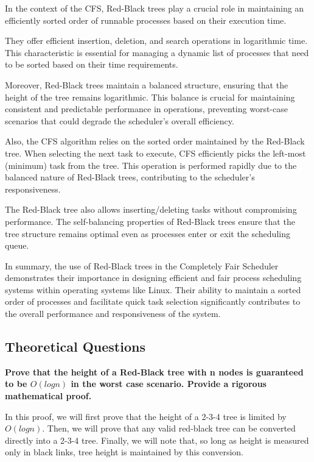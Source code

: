 \documentclass[12pt]{amsart}
\begin{document}
   In the context of the CFS, Red-Black trees play a crucial
   role in maintaining an efficiently sorted order of runnable
   processes based on their execution time.
   
   They offer efficient insertion, deletion, and search
   operations in logarithmic time. This characteristic is
   essential for managing a dynamic list of processes that need
   to be sorted based on their time requirements.
   
   Moreover, Red-Black trees maintain a balanced structure,
   ensuring that the height of the tree remains logarithmic.
   This balance is crucial for maintaining consistent and
   predictable performance in operations, preventing worst-case
   scenarios that could degrade the scheduler's overall
   efficiency.
   
   Also, the CFS algorithm relies on the sorted order maintained
   by the Red-Black tree. When selecting the next task to
   execute, CFS efficiently picks the left-most (minimum) task
   from the tree. This operation is performed rapidly due to the
   balanced nature of Red-Black trees, contributing to the
   scheduler's responsiveness.
   
   The Red-Black tree also allows inserting/deleting tasks
   without compromising performance. The self-balancing
   properties of Red-Black trees ensure that the tree structure
   remains optimal even as processes enter or exit the
   scheduling queue.
   
   In summary, the use of Red-Black trees in the Completely Fair
   Scheduler demonstrates their  importance in designing
   efficient and fair process scheduling systems within
   operating systems like Linux. Their ability to maintain a
   sorted order of processes and facilitate quick task selection
   significantly contributes to the overall performance and
   responsiveness of the system.

\subsection{Theoretical Questions}

    \textbf{Prove that the height of a Red-Black tree with
    n nodes is guaranteed to be $O(log n)$ in the worst
    case scenario. Provide a rigorous mathematical proof.}
    
    In this proof, we will first prove that the height of a
    2-3-4 tree is limited by $O(log n)$. Then, we will prove
    that any valid red-black tree can be converted directly into
    a 2-3-4 tree. Finally, we will note that, so long as height
    is measured only in black links, tree height is maintained
    by this conversion.
\end{document}
